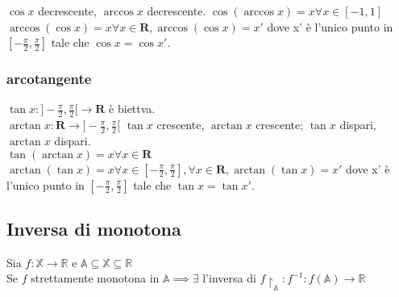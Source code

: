 $\cos x$ decrescente, $\arccos x$ decrescente. 
$\cos(\arccos x)=x \forall x\in[-1,1]$\\
$\arccos(\cos x)=x \forall x\in\mathbf{R}, \arccos(\cos x)=x'$ dove x' \`e l'unico punto in $[-\frac{\pi}{2}, \frac{\pi}{2}]$ tale che $\cos x=\cos x'$.\\

\subsubsection{arcotangente}
$\tan x:]-\frac{\pi}{2}, \frac{\pi}{2}[\rightarrow\mathbf{R}$ \`e biettva.\\
$\arctan x:\mathbf{R}\rightarrow]-\frac{\pi}{2}, \frac{\pi}{2}[$
$\tan x$ crescente, $\arctan x$ crescente; $\tan x$ dispari, $\arctan x$ dispari.\\
$\tan(\arctan x)=x \forall x\in \mathbf{R}$\\
$\arctan(\tan x)=x \forall x\in [-\frac{\pi}{2}, \frac{\pi}{2}], \forall x\in\mathbf{R}, \arctan(\tan x)=x'$ dove x' \`e l'unico punto in $[-\frac{\pi}{2}, \frac{\pi}{2}]$ tale che $\tan x=\tan x'$.

\subsection{Inversa di monotona}
Sia $f: \mathbb{X} \rightarrow \mathbb{R}$ e $\mathbb{A} \subseteq \mathbb{X} \subseteq \mathbb{R}$\\
Se $f$ strettamente monotona in $\mathbb{A} \implies \exists $
 l'inversa di $f\restriction _\mathbb{A}: f^{-1}: f(\mathbb{A}) \rightarrow \mathbb{R}$